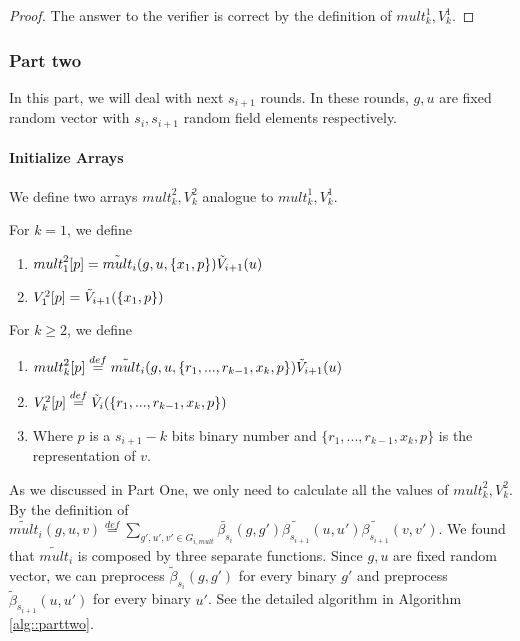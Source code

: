 {\begin{proof}
		The answer to the verifier is correct by the definition of ${mult}_k^1, {V}_k^1$.
	\end{proof}
	
	\subsubsection{Part two}
	In this part, we will deal with next $s_{i+1}$ rounds. In these rounds, $g, u$ are fixed random vector with $s_{i}, s_{i+1}$ random field elements respectively.
	
	\paragraph*{Initialize Arrays}
	We define two arrays ${mult}_k^2, {V}_k^2$ analogue to ${mult}_k^1, {V}_k^1$.
	
	\begin{definition}
		For $k=1$, we define 
		\begin{enumerate}
			\item ${mult}_1^2[p] = \tilde{mult}_i(g, u, \{x_1, p\})\tilde{V}_{i+1}(u)$
			\item ${V}_1^2[p] = \tilde{V}_{i+1}(\{x_1, p\})$
		\end{enumerate}
		For $k\ge 2$, we define
		\begin{enumerate}
			\item ${mult}_k^2[p]\overset{def}{=}\tilde{mult}_i(g, u, \{r_1, ..., r_{k-1}, x_k, p\})\tilde{V}_{i+1}(u)$
			\item ${V}_k^2[p]\overset{def}{=}\tilde{V}_i(\{r_1, ..., r_{k-1}, x_k, p\})$
			\item Where $p$ is a $s_{i+1}-k$ bits binary number and $\{r_1, ..., r_{k-1}, x_k, p\}$ is the representation of $v$.
		\end{enumerate}
	\end{definition}
	
	As we discussed in Part One, we only need to calculate all the values of ${mult}_k^2, {V}_k^2$. By the definition of $\tilde{mult}_i(g, u, v)\overset{def}{=}\sum_{g', u', v' \in G_{i, mult}}\tilde{\beta_{s_i}}(g, g')\tilde{\beta_{s_{i+1}}}(u, u')\tilde{\beta_{s_{i+1}}}(v, v')$. We found that $\tilde{mult}_i$ is composed by three separate functions. Since $g, u$ are fixed random vector, we can preprocess $\tilde{\beta}_{s_i}(g, g')$ for every binary $g'$ and preprocess $\tilde{\beta}_{s_{i+1}}(u, u')$ for every binary $u'$. See the detailed algorithm in Algorithm \ref{alg::parttwo}.
	
}
